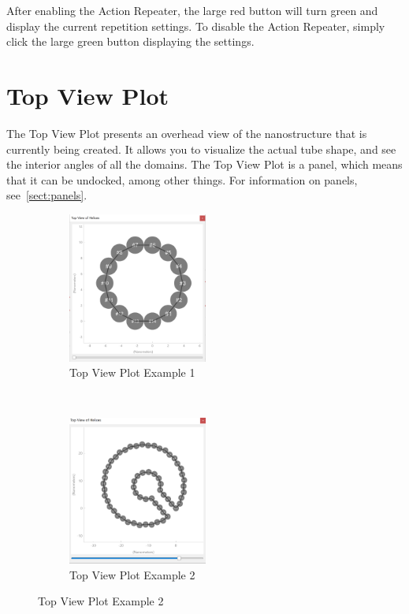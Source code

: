 \documentclass[titlepage]{article}
\begin{document}
After enabling the Action Repeater, the large red button will turn green and display the current repetition settings. To disable the Action Repeater, simply click the large green button displaying the settings.

\section{Top View Plot}

The Top View Plot presents an overhead view of the nanostructure that is currently being created. It allows you to visualize the actual tube shape, and see the interior angles of all the domains. The Top View Plot is a panel, which means that it can be undocked, among other things. For information on panels, see~\ref{sect:panels}.

\begin{figure}[h] \label{fig:top-view-plot-panel}
	\centering
	\caption{Top View Plot Panel}
	\begin{subfigure}{.45\linewidth} \label{fig:top-view-plot-panel-1}
		\centering
		\includegraphics[width=1.8in]{top-view-plot.png}
		\caption{Top View Plot Example 1}
	\end{subfigure}%
	~
	\begin{subfigure}{.45\linewidth} \label{fig:top-view-plot-panel-2}
		\centering
		\includegraphics[width=1.8in]{top-view-plot-2.png}
		\caption{Top View Plot Example 2}
	\end{subfigure}
\end{figure}
\end{document}

